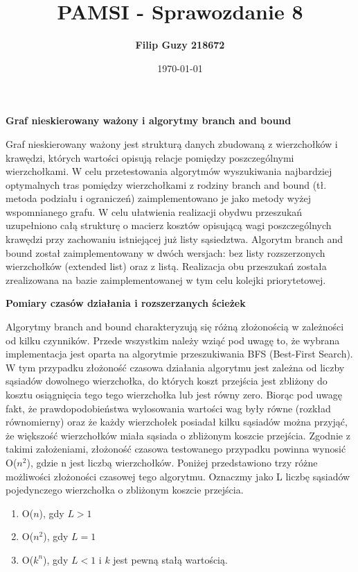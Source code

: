 \documentclass[10pt, a4paper]{article}
\date{\today}
\title{\textbf{PAMSI - Sprawozdanie 8}}
\author{\textbf{Filip Guzy 218672}}
\begin{document}
\maketitle

\begin{flushleft}
\textbf{Graf nieskierowany ważony i algorytmy branch and bound} \newline

Graf nieskierowany ważony jest strukturą danych zbudowaną z wierzchołków i krawędzi, których wartości opisują relacje pomiędzy poszczególnymi wierzchołkami. W celu przetestowania algorytmów wyszukiwania najbardziej optymalnych tras pomiędzy wierzchołkami z rodziny branch and bound (tł. metoda podziału i ograniczeń) zaimplementowano je jako metody wyżej wspomnianego grafu. W celu ułatwienia realizacji obydwu przeszukań uzupełniono całą strukturę o macierz kosztów opisującą wagi poszczególnych krawędzi przy zachowaniu istniejącej już listy sąsiedztwa. Algorytm branch and bound został zaimplementowany w dwóch wersjach: bez listy rozszerzonych wierzchołków (extended list) oraz z listą. Realizacja obu przeszukań została zrealizowana na bazie zaimplementowanej w tym celu kolejki priorytetowej. \newline

\textbf{Pomiary czasów działania i rozszerzanych ścieżek} \newline

Algorytmy branch and bound charakteryzują się różną złożonością w zależności od kilku czynników. Przede wszystkim należy wziąć pod uwagę to, że wybrana implementacja jest oparta na algorytmie przeszukiwania BFS (Best-First Search). W tym przypadku złożoność czasowa działania algorytmu jest zależna od liczby sąsiadów dowolnego wierzchołka, do których koszt przejścia jest zbliżony do kosztu osiągnięcia tego tego wierzchołka lub jest równy zero. Biorąc pod uwagę fakt, że prawdopodobieństwa wylosowania wartości wag były równe (rozkład równomierny) oraz że każdy wierzchołek posiadał kilku sąsiadów można przyjąć, że większość wierzchołków miała sąsiada o zbliżonym koszcie przejścia. Zgodnie z takimi założeniami, złożoność czasowa testowanego przypadku powinna wynosić O($n^2$), gdzie n jest liczbą wierzchołków. Poniżej przedstawiono trzy różne możliwości złożoności czasowej tego algorytmu. Oznaczmy jako L liczbę sąsiadów pojedynczego wierzchołka o zbliżonym koszcie przejścia.

\begin{enumerate}
\item O($n$), gdy $L>1$
\item O($n^2$), gdy $L=1$
\item O($k^n$), gdy $L<1$ i $k$ jest pewną stałą wartością.
\end{enumerate}


\end{flushleft}
\end{document}
